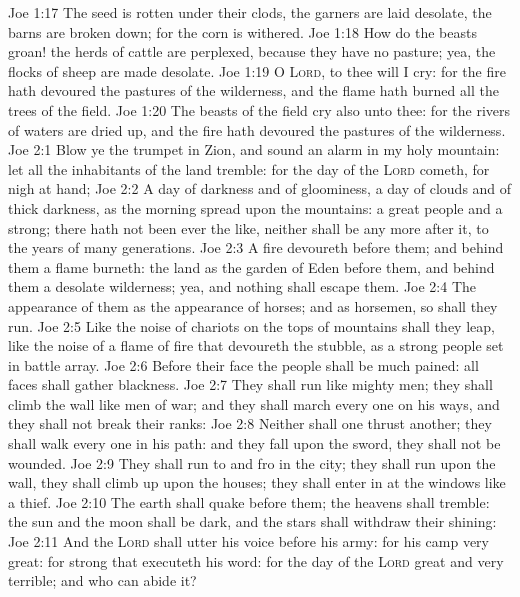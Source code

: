 \vs Joe 1:17 The seed is rotten under their clods, the garners are laid desolate, the barns are broken down; for the corn is withered.
\vs Joe 1:18 How do the beasts groan! the herds of cattle are perplexed, because they have no pasture; yea, the flocks of sheep are made desolate.
\vs Joe 1:19 O \textsc{Lord}, to thee will I cry: for the fire hath devoured the pastures of the wilderness, and the flame hath burned all the trees of the field.
\vs Joe 1:20 The beasts of the field cry also unto thee: for the rivers of waters are dried up, and the fire hath devoured the pastures of the wilderness.
\vs Joe 2:1 Blow ye the trumpet in Zion, and sound an alarm in my holy mountain: let all the inhabitants of the land tremble: for the day of the \textsc{Lord} cometh, for  nigh at hand;
\vs Joe 2:2 A day of darkness and of gloominess, a day of clouds and of thick darkness, as the morning spread upon the mountains: a great people and a strong; there hath not been ever the like, neither shall be any more after it,  to the years of many generations.
\vs Joe 2:3 A fire devoureth before them; and behind them a flame burneth: the land  as the garden of Eden before them, and behind them a desolate wilderness; yea, and nothing shall escape them.
\vs Joe 2:4 The appearance of them  as the appearance of horses; and as horsemen, so shall they run.
\vs Joe 2:5 Like the noise of chariots on the tops of mountains shall they leap, like the noise of a flame of fire that devoureth the stubble, as a strong people set in battle array.
\vs Joe 2:6 Before their face the people shall be much pained: all faces shall gather blackness.
\vs Joe 2:7 They shall run like mighty men; they shall climb the wall like men of war; and they shall march every one on his ways, and they shall not break their ranks:
\vs Joe 2:8 Neither shall one thrust another; they shall walk every one in his path: and  they fall upon the sword, they shall not be wounded.
\vs Joe 2:9 They shall run to and fro in the city; they shall run upon the wall, they shall climb up upon the houses; they shall enter in at the windows like a thief.
\vs Joe 2:10 The earth shall quake before them; the heavens shall tremble: the sun and the moon shall be dark, and the stars shall withdraw their shining:
\vs Joe 2:11 And the \textsc{Lord} shall utter his voice before his army: for his camp  very great: for  strong that executeth his word: for the day of the \textsc{Lord}  great and very terrible; and who can abide it?
